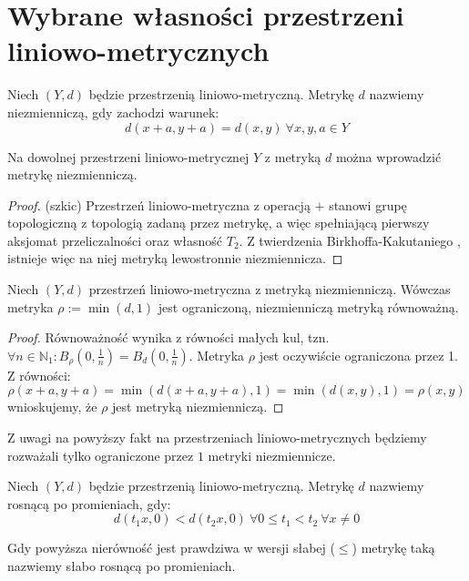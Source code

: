 \section{Wybrane własności przestrzeni liniowo-metrycznych}

\begin{df}
  Niech $(Y, d)$ będzie przestrzenią liniowo-metryczną. Metrykę $d$ nazwiemy niezmienniczą, gdy zachodzi warunek:
  \[d(x+a, y+a) = d(x,y)\ \forall x, y, a \in Y\] 
\end{df}


\begin{fact}
  Na dowolnej przestrzeni liniowo-metrycznej $Y$ z metryką $d$ można wprowadzić metrykę niezmienniczą.
  
  \begin{proof}(szkic) Przestrzeń liniowo-metryczna z operacją $+$ stanowi grupę topologiczną z topologią zadaną przez metrykę, a więc spełniającą pierwszy aksjomat przeliczalności oraz własność $T_2$. Z twierdzenia Birkhoffa-Kakutaniego \cite{bir}, \cite{kak} istnieje więc na niej metryką lewostronnie niezmiennicza.
  \end{proof}
\end{fact}

\begin{note}
  Niech $(Y, d)$ przestrzeń liniowo-metryczna z metryką niezmienniczą. Wówczas metryka $\rho := \min(d, 1)$ jest ograniczoną, niezmienniczą metryką równoważną.
  \begin{proof}
    Równoważność wynika z równości małych kul, tzn. $\forall n \in \mathbb{N}_1: B_\rho(0, \frac{1}{n}) = B_d(0, \frac{1}{n})$. Metryka $\rho$ jest oczywiście ograniczona przez 1. Z równości:
    \[
      \rho(x+a, y+a) = \min(d(x+a, y+a), 1) = \min(d(x,y), 1) = \rho(x,y)
    \]
    wnioskujemy, że $\rho$ jest metryką niezmienniczą.
  \end{proof}
\end{note}


Z uwagi na powyższy fakt na przestrzeniach liniowo-metrycznych będziemy rozważali tylko ograniczone przez $1$ metryki niezmiennicze.

\begin{df}
  Niech $(Y, d)$ będzie przestrzenią liniowo-metryczną. Metrykę $d$ nazwiemy rosnącą po promieniach, gdy:
  \[d(t_1 x, 0) < d(t_2 x, 0)\ \forall 0 \leq t_1 < t_2\ \forall x \neq 0\]
  
  Gdy powyższa nierówność jest prawdziwa w wersji słabej ($\leq$) metrykę taką nazwiemy słabo rosnącą po promieniach.
\end{df}

